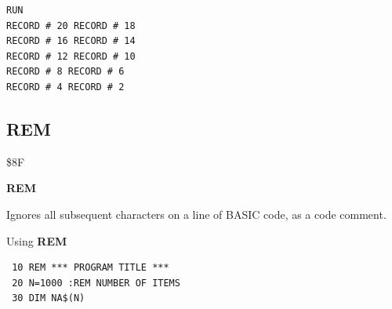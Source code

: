 \begin{description}[leftmargin=2cm,style=nextline]
\begin{tcolorbox}[colback=black,coltext=white]
\begin{verbatim}
RUN
RECORD # 20 RECORD # 18
RECORD # 16 RECORD # 14
RECORD # 12 RECORD # 10
RECORD # 8 RECORD # 6
RECORD # 4 RECORD # 2
\end{verbatim}
\end{tcolorbox}
\end{description}


\newpage
\subsection{REM}
\begin{description}[leftmargin=2cm,style=nextline]
\item [Token:] \$8F
\item [Format:] {\bf REM}
\item [Usage:]  Ignores all subsequent characters on a line of BASIC code, as a code comment.

\item [Example:] Using {\bf REM}

\begin{tcolorbox}[colback=black,coltext=white]
\verbatimfont{\codefont}
\begin{verbatim}
 10 REM *** PROGRAM TITLE ***
 20 N=1000 :REM NUMBER OF ITEMS
 30 DIM NA$(N)
\end{verbatim}
\end{tcolorbox}
\end{description}


\newpage
